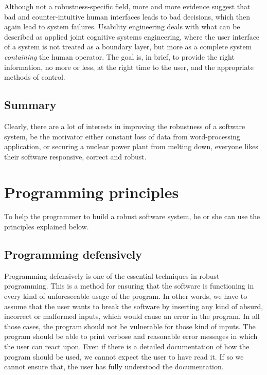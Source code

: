 \documentclass[10pt,a4paper]{article}
\begin{document}
Although not a robustness-specific field, more and more evidence suggest that bad and counter-intuitive human interfaces leads to bad decisions, which then again lead to system failures.
Usability engineering deals with what can be described as applied joint cognitive systems\cite{hollnagel2005joint} engineering, where the user interface of a system is not treated as a boundary layer, but more as a complete system \emph{containing} the human operator.
The goal is, in brief, to provide the right information, no more or less, at the right time to the user, and the appropriate methods of control.

\subsection{Summary}
Clearly, there are a lot of interests in improving the robustness of a software system, be the motivator either constant loss of data from word-processing application, or securing a nuclear power plant from melting down, everyone likes their software responsive, correct and robust.

\section{Programming principles}
\label{sec:programming_principles}

To help the programmer to build a robust software system, he or she can use the principles explained below.

\subsection{Programming defensively}

Programming defensively is one of the essential techniques in robust programming.
This is a method for ensuring that the software is functioning in every kind of unforeseeable usage of the program. In other words, we have to assume that the user wants to break the software by inserting any kind of absurd, incorrect or malformed inputs, which would cause an error in the program. In all those cases, the program should not be vulnerable for those kind of inputs. The program should be able to print verbose and reasonable error messages in which the user can react upon.
Even if there is a detailed documentation of how the program should be used, we cannot expect the user to have read it. If so we cannot ensure that, the user has fully understood the documentation.\\
\end{document}
